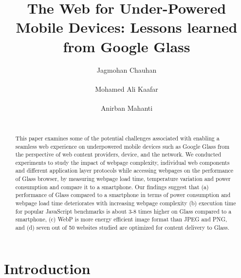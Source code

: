 \documentclass{sig-alternate-10pt}
\begin{document}
\title{The Web for Under-Powered Mobile Devices: Lessons learned from Google Glass }



 \author{
\alignauthor
Jagmohan Chauhan\\
       \\
\alignauthor
Mohamed Ali Kaafar\\
       \\
\alignauthor
Anirban Mahanti \\
       \\
}



\maketitle
\begin{abstract}
This paper examines some of the potential challenges associated with enabling a seamless web experience on underpowered mobile devices such as Google Glass from the  perspective of web content providers,  device, and the network. We conducted experiments to study the impact of webpage complexity, individual web components and  different application layer  protocols while accessing webpages    on the performance of  Glass browser, by measuring webpage load time, temperature variation and power consumption and compare it to a smartphone. 
Our findings suggest that (a)  performance of Glass compared to a smartphone in terms of  power consumption and webpage load time deteriorates with increasing webpage complexity (b)  execution time for popular JavaScript benchmarks  is about 3-8 times higher on Glass compared to a smartphone, (c)  WebP is more energy efficient image format  than JPEG and PNG, and (d)  seven out of 50  websites studied  are  optimized for content delivery to Glass. 










\end{abstract}







\section{Introduction}
\end{document}
